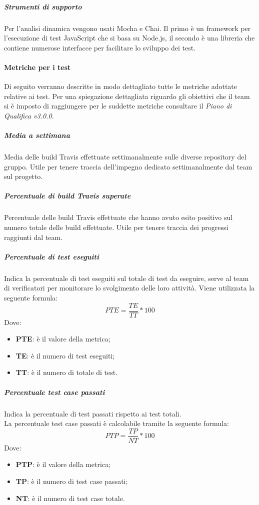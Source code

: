 \subparagraph{Strumenti di supporto} \Spazio
Per l'analisi dinamica vengono usati Mocha e Chai. Il primo è un framework  per l'esecuzione di test JavaScript che si basa su Node.js, il secondo è una libreria che contiene numerose interfacce per facilitare lo sviluppo dei test.

\paragraph{Metriche per i test}  \Spazio
Di seguito verranno descritte in modo dettagliato tutte le metriche adottate relative ai test. Per una spiegazione dettagliata riguardo gli obiettivi che il team si è imposto di raggiungere per le suddette metriche consultare il \emph{Piano di Qualifica v3.0.0.}

\subparagraph{Media   a settimana}\Spazio
Media delle build Travis effettuate settimanalmente sulle diverse repository del gruppo. Utile per tenere traccia dell'impegno dedicato settimanalmente dal team sul progetto.
\subparagraph{Percentuale di build Travis superate}\Spazio
Percentuale delle build Travis effettuate che hanno avuto esito positivo sul numero totale delle build effettuate. Utile per tenere traccia dei progressi raggiunti dal team.
\subparagraph{Percentuale di test eseguiti}\Spazio
Indica la percentuale di test eseguiti sul totale di test da eseguire, serve al team di verificatori per monitorare lo svolgimento delle loro attività.
Viene utilizzata la seguente formula:
$$PTE=\frac{TE}{TT}*100$$
Dove:
\begin{itemize}
	\item{\textbf{PTE}: è il valore della metrica;}
	\item{\textbf{TE}: è il numero di test eseguiti;}
	\item{\textbf{TT}: è il numero di totale di test.}
\end{itemize}

\subparagraph{Percentuale test case passati}\Spazio
Indica la percentuale di test passati rispetto ai test totali.\\
La percentuale test case passati è calcolabile tramite la seguente formula:
$$PTP=\frac{TP}{NT}*100$$
Dove:
\begin{itemize}
	\item{\textbf{PTP}: è il valore della metrica;}
	\item{\textbf{TP}: è il numero di test case passati;}
	\item{\textbf{NT}: è il numero di test case totale.}
\end{itemize}


